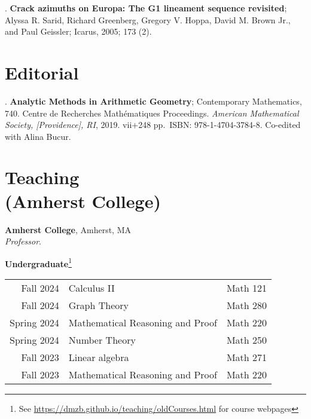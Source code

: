\documentclass[margin,line]{res}
\newcounter{pubs}
\newcommand{\defi}[1]{\textsf{#1}} 				%
\begin{document}
\begin{resume}
 .  \textbf{Crack azimuths on Europa: The G1 lineament sequence revisited}; Alyssa R. Sarid, Richard Greenberg, Gregory V. Hoppa, David M. Brown Jr., and Paul Geissler; Icarus, 2005; 173 (2). \vspace{.08cm}\\ 


\section{\sc Editorial}


 .  \textbf{Analytic Methods in Arithmetic Geometry}; Contemporary
Mathematics, 740. Centre de Recherches Math\'ematiques Proceedings. \emph{American Mathematical Society, [Providence], RI}, 2019. vii+248 pp.~ISBN: 978-1-4704-3784-8. Co-edited with Alina Bucur. \vspace{.08cm}\\ 


\newpage
\vspace{-7pt}
\section{\sc Teaching \\ (Amherst College)}

{\bf Amherst College}, Amherst, MA\\
\emph{Professor}. 
\vspace{2pt}




{\bf Undergraduate}\footnote{See \url{https://dmzb.github.io/teaching/oldCourses.html} for course webpages}
\vspace*{-.1in}

\begin{tabular}{rll}
 Fall 2024 & \defi{Calculus II} & Math 121\\  
 Fall 2024 & \defi{Graph Theory} & Math 280\\    
 Spring 2024 & \defi{Mathematical Reasoning and Proof} & Math 220\\  
 Spring 2024 & \defi{Number Theory} & Math 250\\  
 Fall 2023 & \defi{Linear algebra} & Math 271\\  
 Fall 2023 & \defi{Mathematical Reasoning and Proof} & Math 220\\  
\end{tabular}


\end{resume}
\end{document}
